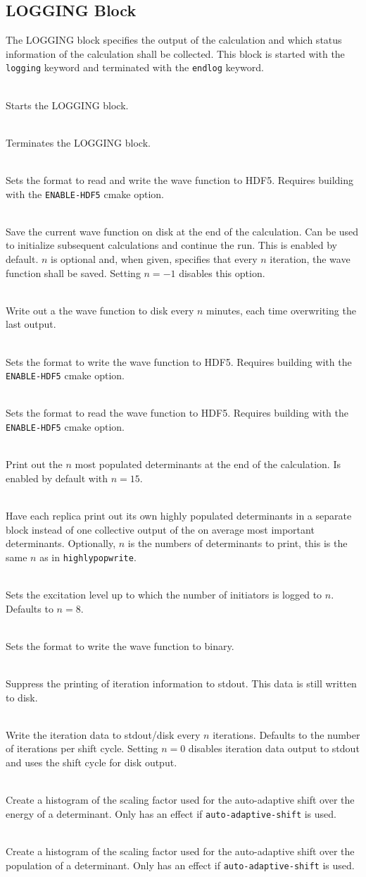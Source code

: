 \documentclass[a4paper,notitlepage,dvipsnames]{scrreprt}
\newcommand\codeitem[1]{\needspace{1.5\baselineskip}\item[\textnormal{\ttfamily #1 \nopagebreak}] \hfill \\ \nopagebreak}
\let\code\lstinline
\begin{document}
    \subsection{LOGGING Block}
    The LOGGING block specifies the output of the calculation and which
    status information of the calculation shall be collected. This block is
    started with the \texttt{logging} keyword and terminated with the
    \texttt{endlog} keyword.
    \begin{description}
      \codeitem{\textcolor{oblue}{logging}}
      Starts the LOGGING block.
      \codeitem{\textcolor{oblue}{endlog}}
      Terminates the LOGGING block.
      \codeitem{\textcolor{oblue}{hdf5-popsfile}}
      Sets the format to read and write the wave function to HDF5. Requires building
      with the \texttt{ENABLE-HDF5} cmake option.
      \codeitem{popsfile $n$}
      Save the current wave function on disk at the end of the
      calculation. Can be used to initialize subsequent calculations and
      continue the run. This is enabled by default. $n$ is optional and, when
      given, specifies that every $n$ iteration, the wave function shall be
      saved. Setting $n=-1$ disables this option.
      \codeitem{popsFileTimer $n$}
      Write out a the wave function to disk every $n$ minutes, each time
      overwriting the last output.
      \codeitem{hdf5-pops-write}
      Sets the format to write the wave function to HDF5. Requires building
      with the \texttt{ENABLE-HDF5} cmake option.
      \codeitem{hdf5-pops-read}
      Sets the format to read the wave function to HDF5. Requires building
      with the \texttt{ENABLE-HDF5} cmake option.
      \codeitem{highlyPopWrite $n$}
      Print out the $n$ most populated determinants at the end of the
      calculation. Is enabled by default with $n=15$.
      \codeitem{replicas-popwrite [$n$]}
      Have each replica print out its own highly populated determinants in a
      separate block instead of one collective output of the on average most
      important determinants. Optionally, $n$ is the numbers of determinants
      to print, this is the same $n$ as in \code{highlypopwrite}.
      \codeitem{inits-exlvl-write $n$}
      Sets the excitation level up to which the number of initiators is logged
      to $n$. Defaults to $n=8$.
      \codeitem{binarypops}
      Sets the format to write the wave function to binary.
      \codeitem{nomcoutput}
      Suppress the printing of iteration information to stdout. This data is
      still written to disk.
      \codeitem{stepsOutput $n$}
      Write the iteration data to stdout/disk every $n$ iterations. Defaults
      to the number of iterations per shift cycle. Setting $n=0$ disables
      iteration data output to stdout and uses the shift cycle for disk
      output.
      \codeitem{fval-energy-hist}
      Create a histogram of the scaling factor used for the auto-adaptive shift
      over the energy of a determinant. Only has an effect if
      \code{auto-adaptive-shift} is used.
      \codeitem{fval-pops-hist}
      Create a histogram of the scaling factor used for the auto-adaptive shift
      over the population of a determinant. Only has an effect if
      \code{auto-adaptive-shift} is used.
    \end{description}
\end{document}
